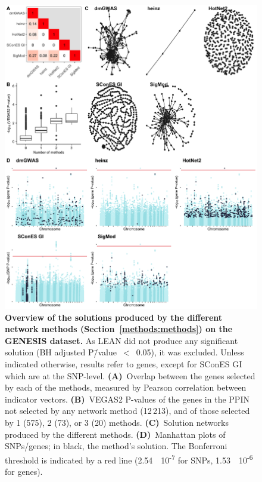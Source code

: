 \documentclass[10pt,letterpaper]{article}
\begin{document}
\begin{figure}[!ht]
  \centering
  \includegraphics[width=\textwidth]{./figures/figure_1.png}
  \caption{{\bf Overview of the solutions produced by the different network methods (Section~\ref{methods:methods}) on the GENESIS dataset. } As LEAN did not produce any significant solution (BH adjusted P\=/value~$<$~0.05), it was excluded. Unless indicated otherwise, results refer to genes, except for SConES GI which are at the SNP-level. \textbf{(A)}~Overlap between the genes selected by each of the methods, measured by Pearson correlation between indicator vectors. \textbf{(B)}~VEGAS2 P-values of the genes in the PPIN not selected by any network method (12\,213), and of those selected by 1 (575), 2 (73), or 3 (20) methods. \textbf{(C)}~Solution networks produced by the different methods. \textbf{(D)}~Manhattan plots of SNPs/genes; in black, the method's solution. The Bonferroni threshold is indicated by a red line (2.54~\texttimes{}~10\textsuperscript{-7} for SNPs, 1.53~\texttimes{}~10\textsuperscript{-6} for genes).}
  \label{fig:solution_overview}
\end{figure}
\end{document}
